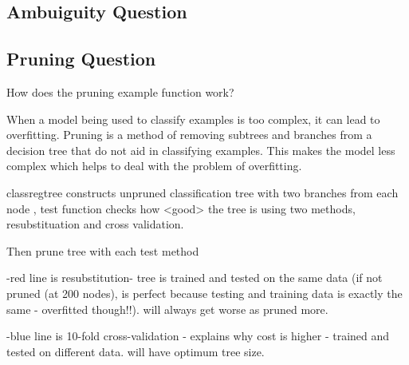 \documentclass[a4paper,11pt]{article}
\begin{document}
\subsection{Ambuiguity Question}



\subsection{Pruning Question}

How does the pruning example function work? 

When a model being used to classify examples is too complex, it can lead to overfitting. Pruning is a method of removing subtrees and branches from a decision tree that do not aid in classifying examples. This makes the model less complex which helps to deal with the problem of overfitting.

classregtree constructs unpruned classification tree with two branches
from each node , test function checks how <good> the tree is using two
methods,  resubstituation and cross validation.

Then prune tree with each test method 

-red line is resubstitution- tree is trained and tested on the same
 data (if not pruned (at 200 nodes), is perfect because testing and
 training data is exactly the same - overfitted though!!). will always
 get worse as pruned more.

-blue line is 10-fold cross-validation - explains why cost is higher -
 trained and tested on different data. will have optimum tree size.



\end{document}
